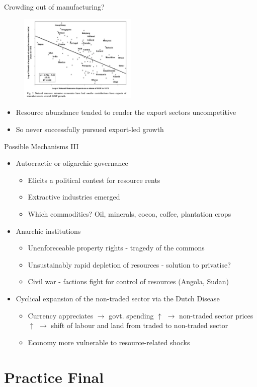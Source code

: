 \documentclass[11pt,notes=hide,aspectratio=169,mathserif]{beamer}
\begin{document}
\begin{frame}{Crowding out of manufacturing?}
\begin{figure}
\centering
\includegraphics[width=0.5\textwidth]{../TA9/inputs/fig3.png}
\end{figure}
\begin{itemize}
\item Resource abundance tended to render the export sectors uncompetitive
\item So never successfully pursued export-led growth
\end{itemize}
\end{frame}

\begin{frame}{Possible Mechanisms III}
\begin{itemize}
\item Autocractic or oligarchic governance
\begin{itemize}
    \pause \item Elicits a political contest for resource rents
    \pause \item Extractive industries emerged 
    \pause \item Which commodities? Oil, minerals, cocoa, coffee, plantation crops
\end{itemize}
\item Anarchic institutions
\begin{itemize}
    \pause \item Unenforeceable property rights - tragedy of the commons
    \pause \item Unsustainably rapid depletion of resources - solution to privatise?
    \pause \item Civil war - factions fight for control of resources (Angola, Sudan) 
\end{itemize}
\pause \item Cyclical expansion of the non-traded sector via the Dutch Disease
\begin{itemize}
    \pause \item Currency appreciates $\rightarrow$ govt. spending $\uparrow$ $\rightarrow$ non-traded sector prices $\uparrow$ $\rightarrow$ shift of labour and land from traded to non-traded sector
    \pause \item Economy more vulnerable to resource-related shocks
\end{itemize}
\end{itemize}
\end{frame}

\section*{Practice Final}
\end{document}
